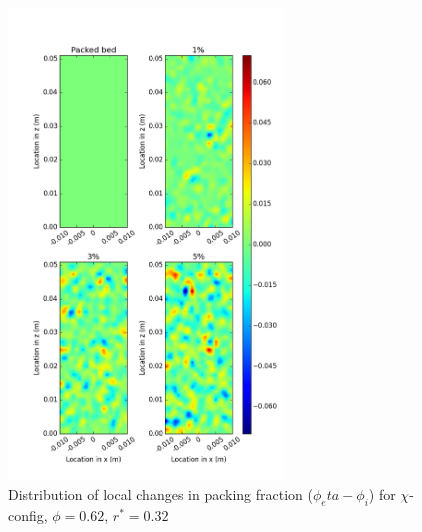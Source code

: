 \begin{figure}[!t]
    \centering
    \includegraphics[width = 0.65\textwidth]{figures/x-62-r23-1-deltas.png}
    \caption{Distribution of local changes in packing fraction ($\phi_eta - \phi_i$) for $\chi$-config, $\phi = 0.62$, $r^* = 0.32$}\label{fig:x-62-r23-deltas}
\end{figure}

